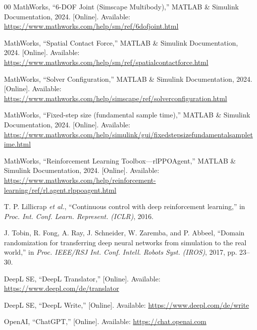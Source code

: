 \documentclass{ieeeaccess}
\begin{document}
\begin{thebibliography}{00}
MathWorks, ``6-DOF Joint (Simscape Multibody),'' MATLAB \& Simulink Documentation, 2024. [Online]. Available: \url{https://www.mathworks.com/help/sm/ref/6dofjoint.html}



MathWorks, ``Spatial Contact Force,'' MATLAB \& Simulink Documentation, 2024. [Online]. Available: \url{https://www.mathworks.com/help/sm/ref/spatialcontactforce.html}



MathWorks, ``Solver Configuration,'' MATLAB \& Simulink Documentation, 2024. [Online]. Available: \url{https://www.mathworks.com/help/simscape/ref/solverconfiguration.html}



MathWorks, ``Fixed-step size (fundamental sample time),'' MATLAB \& Simulink Documentation, 2024. [Online]. Available: \url{https://www.mathworks.com/help/simulink/gui/fixedstepsizefundamentalsampletime.html}



MathWorks, ``Reinforcement Learning Toolbox---rlPPOAgent,'' MATLAB \& Simulink Documentation, 2024. [Online]. Available: \url{https://www.mathworks.com/help/reinforcement-learning/ref/rl.agent.rlppoagent.html}



T. P. Lillicrap \emph{et al.}, ``Continuous control with deep reinforcement learning,'' in \emph{Proc. Int. Conf. Learn. Represent. (ICLR)}, 2016.



J. Tobin, R. Fong, A. Ray, J. Schneider, W. Zaremba, and P. Abbeel, ``Domain randomization for transferring deep neural networks from simulation to the real world,'' in \emph{Proc. IEEE/RSJ Int. Conf. Intell. Robots Syst. (IROS)}, 2017, pp. 23--30.


DeepL SE, ``DeepL Translator,'' [Online]. Available: \url{https://www.deepl.com/de/translator}

DeepL SE, ``DeepL Write,'' [Online]. Available: \url{https://www.deepl.com/de/write}


OpenAI, ``ChatGPT,'' [Online]. Available: \url{https://chat.openai.com}



\end{thebibliography}
\end{document}
